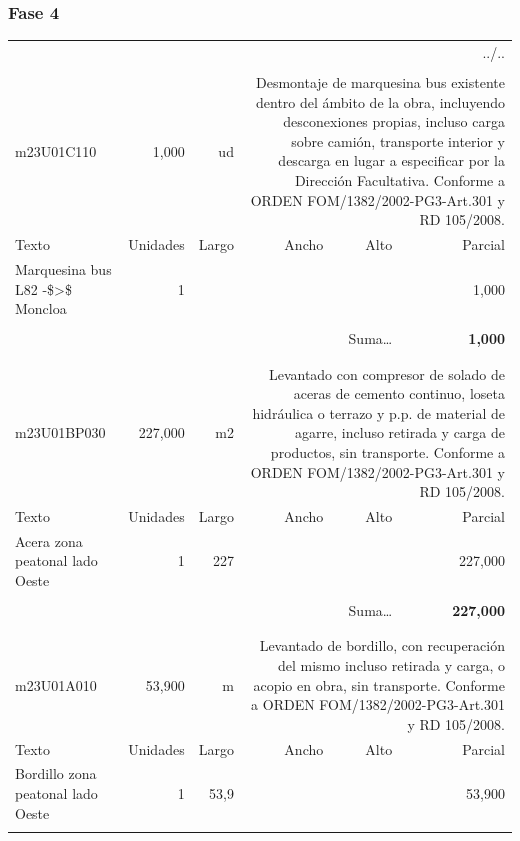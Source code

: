 \documentclass{book}%
\begin{document}
\subsubsection{Fase 4}%
\begin{longtable}{lrrrrr}%
\multicolumn{6}{r}{../..}\\%
\endfoot%
\endlastfoot%
&&&&&\\%
m23U01C110&     1,000& ud&\multicolumn{3}{p{6cm}}{\scriptsize Desmontaje de marquesina bus existente dentro del ámbito de la obra, incluyendo desconexiones propias, incluso carga sobre camión, transporte interior y descarga en lugar a especificar por la Dirección Facultativa. Conforme a ORDEN FOM/1382/2002-PG3-Art.301 y RD 105/2008.\normalsize}\\%
Texto&Unidades&Largo&Ancho&Alto&Parcial\\%
\hline%
\multicolumn{1}{p{3.5cm}}{Marquesina bus L82 {-}\$>\$ Moncloa}&1&&&&     1,000\\%
&&&&&\\%
\multicolumn{5}{r}{Suma\ldots}&\textbf{     1,000}\\%
\hline%
&&&&&\\%
&&&&&\\%
m23U01BP030&   227,000& m2&\multicolumn{3}{p{6cm}}{\scriptsize Levantado con compresor de solado de aceras de cemento continuo, loseta hidráulica o terrazo y p.p. de material de agarre, incluso retirada y carga de productos, sin transporte. Conforme a ORDEN FOM/1382/2002-PG3-Art.301 y RD 105/2008.\normalsize}\\%
Texto&Unidades&Largo&Ancho&Alto&Parcial\\%
\hline%
\multicolumn{1}{p{3.5cm}}{Acera zona peatonal lado Oeste}&1&227&&&   227,000\\%
&&&&&\\%
\multicolumn{5}{r}{Suma\ldots}&\textbf{   227,000}\\%
\hline%
&&&&&\\%
&&&&&\\%
m23U01A010&    53,900& m&\multicolumn{3}{p{6cm}}{\scriptsize Levantado de bordillo, con recuperación del mismo incluso retirada y carga, o acopio en obra, sin transporte. Conforme a ORDEN FOM/1382/2002-PG3-Art.301 y RD 105/2008.\normalsize}\\%
Texto&Unidades&Largo&Ancho&Alto&Parcial\\%
\hline%
\multicolumn{1}{p{3.5cm}}{Bordillo  zona peatonal lado Oeste}&1&53,9&&&    53,900\\%
&&&&&\\%

\end{longtable}
\end{document}
